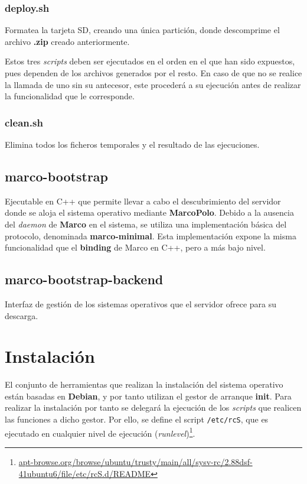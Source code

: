 \documentclass{article}
\begin{document}
\subsubsection*{deploy.sh}

Formatea la tarjeta SD, creando una única partición, donde descomprime el archivo \textbf{.zip} creado anteriormente.

Estos tres \textit{scripts} deben ser ejecutados en el orden en el que han sido expuestos, pues dependen de los archivos generados por el resto. En caso de que no se realice la llamada de uno sin su antecesor, este procederá a su ejecución antes de realizar la funcionalidad que le corresponde.

\subsubsection*{clean.sh}

Elimina todos los ficheros temporales y el resultado de las ejecuciones.

\subsection{marco-bootstrap}

Ejecutable en C++ que permite llevar a cabo el descubrimiento del servidor donde se aloja el sistema operativo mediante \textbf{MarcoPolo}. Debido a la ausencia del \textit{daemon} de \textbf{Marco} en el sistema, se utiliza una implementación básica del protocolo, denominada \textbf{marco-minimal}. Esta implementación expone la misma funcionalidad que el \textbf{binding} de Marco en C++, pero a más bajo nivel.

\subsection{marco-bootstrap-backend}

Interfaz de gestión de los sistemas operativos que el servidor ofrece para su descarga.

\section{Instalación}

El conjunto de herramientas que realizan la instalación del sistema operativo están basadas en \textbf{Debian}, y por tanto utilizan el gestor de arranque \textbf{init}. Para realizar la instalación por tanto se delegará la ejecución de los \textit{scripts} que realicen las funciones a dicho gestor. Por ello, se define el script \texttt{/etc/rcS}, que es ejecutado en cualquier nivel de ejecución (\textit{runlevel})\footnote{\href{http://apt-browse.org/browse/ubuntu/trusty/main/all/sysv-rc/2.88dsf-41ubuntu6/file/etc/rcS.d/README}{apt-browse.org/browse/ubuntu/trusty/main/all/sysv-rc/2.88dsf-41ubuntu6/file/etc/rcS.d/README}}. 
\end{document}
